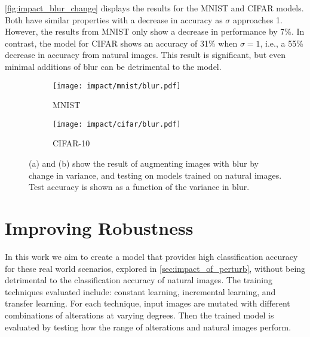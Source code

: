 \documentclass[conference]{IEEEtran}
\begin{document}
\autoref{fig:impact_blur_change} displays the results for the MNIST and CIFAR models. Both have similar properties with a decrease in accuracy as $\sigma$ approaches 1. However, the results from MNIST only show a decrease in performance by 7\%. In contrast, the model for CIFAR shows an accuracy of 31\% when $\sigma=1$, i.e., a 55\% decrease in accuracy from natural images. This result is significant, but even minimal additions of blur can be detrimental to the model.

\begin{figure}[H]
    \centering
    \begin{subfigure}{0.49\columnwidth}
        \centering
        \texttt{[image: impact/mnist/blur.pdf]}
        \caption{MNIST}
    \end{subfigure}
    \begin{subfigure}{0.49\columnwidth}
        \centering
        \texttt{[image: impact/cifar/blur.pdf]}
        \caption{CIFAR-10}
    \end{subfigure}
    \captionsetup{width=1\columnwidth}
    \caption{(a) and (b) show the result of augmenting images with blur by change in variance, and testing on models trained on natural images. Test accuracy is shown as a function of the variance in blur.}
    \label{fig:impact_blur_change}
\end{figure}

\section{Improving Robustness}
\label{sec:improving_robustness}

In this work we aim to create a model that provides high classification accuracy for these real world scenarios, explored in \autoref{sec:impact_of_perturb}, without being detrimental to the classification accuracy of natural images. The training techniques evaluated include: constant learning, incremental learning, and transfer learning. For each technique, input images are mutated with different combinations of alterations at varying degrees. Then the trained model is evaluated by testing how the range of alterations and natural images perform.
\end{document}
